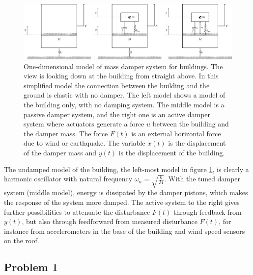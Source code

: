\documentclass[letterpaper,11pt]{article}
\begin{document}
\begin{figure}
\begin{center}
\includegraphics[width=\linewidth]{active-mass-damper-system-vertical}
\caption{One-dimensional model of mass damper system for buildings. The view is looking down at the building from straight above. In this simplified model the connection between the building and the ground is elastic with no damper. The left model shows a model of the building only, with no damping system. The middle model is a passive damper system, and the right one is an active damper system where actuators generate a force $u$ between the building and the damper mass. The force $F(t)$ is an external horizontal force due to wind or earthquake. The variable $x(t)$ is the displacement of the damper mass and $y(t)$ is the displacement of the building.}
\label{fig:amd}
\end{center}
\end{figure}
The undamped model of the building, the left-most model in figure \ref{fig:amd}, is clearly a harmonic oscillator with natural frequency \(\omega_n = \sqrt{\frac{k}{M}}\). With the tuned damper system (middle model), energy is dissipated by the damper pistons, which makes the response of the system more damped. The active system to the right gives further possibilities to attenuate the disturbance $F(t)$ through feedback from $y(t)$, but also through feedforward from measured disturbance $F(t)$, for instance from  accelerometers in the base of the building and wind speed sensors on the roof. 

\subsection*{Problem 1}
\end{document}
